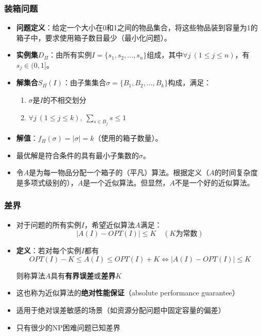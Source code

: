 \documentclass[./../main.tex]{subfiles} %
\begin{document}
\subsubsection{装箱问题}
\begin{itemize}
    \item \textbf{问题定义}：给定一个大小在0和1之间的物品集合，将这些物品装到容量为1的箱子中，要求使用箱子数目最少（最小化问题）。
    
    \item \textbf{实例集$D_{\Pi}$}：由所有实例$I = \{s_1, s_2, \dots, s_n\}$组成，其中$\forall j\ (1\leq j\leq n)$，有$s_j \in (0,1]$。
    
    \item \textbf{解集合$S_{\Pi}(I)$}：由子集集合$\sigma = \{B_1, B_2, \dots, B_k\}$构成，满足：
    \begin{enumerate}
        \item $\sigma$是$I$的不相交划分
        \item $\forall j\ (1\leq j\leq k),\ \sum_{s\in B_j}s \leq 1$
    \end{enumerate}
    
    \item \textbf{解值}：$f_{\Pi}(\sigma) = |\sigma| = k$（使用的箱子数量）。
    \item 最优解是符合条件的具有最小子集数的$\sigma$。
    
    \item 令$A$是为每一物品分配一个箱子的（平凡）算法。根据定义（$A$的时间复杂度是多项式级别的），$A$是一个近似算法。但显然，$A$不是一个好的近似算法。
\end{itemize}

\subsubsection{差界}
\begin{itemize}
    \item 对于问题的所有实例$I$，希望近似算法$A$满足：
    $$
    |A(I) - OPT(I)| \leq K \quad (K\text{为常数})
    $$
    
    \item \textbf{定义}：若对每个实例$I$都有
    $$
    OPT(I) - K \leq A(I) \leq OPT(I) + K \iff |A(I) - OPT(I)| \leq K
    $$
    
    则称算法$A$具有\textbf{有界误差}或\textbf{差界}$K$
    
    \item 这也称为近似算法的\textbf{绝对性能保证}（absolute performance guarantee）
    \item 适用于绝对误差敏感的场景（如资源分配问题中固定容量的偏差）
    
    \item 只有很少的NP困难问题已知差界
\end{itemize}
\end{document}
